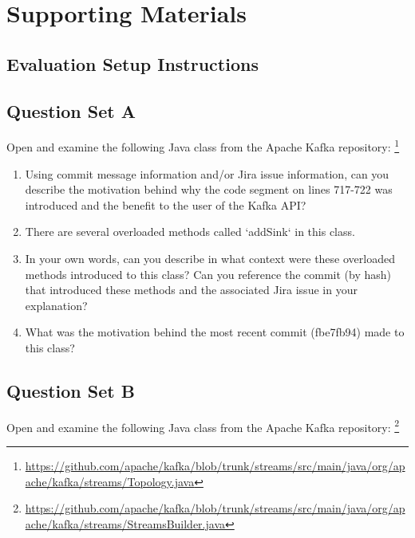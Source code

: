 \chapter{Supporting Materials}

\section{Evaluation Setup Instructions}
\label{sec:Setup-Instructions}


\section{Question Set A}
\label{sec:Question-Set-A}

Open and examine the following Java class from the Apache Kafka repository:
\footnote{\url{https://github.com/apache/kafka/blob/trunk/streams/src/main/java/org/apache/kafka/streams/Topology.java}}

\begin{enumerate}
    \item Using commit message information and/or Jira issue information, can you describe the motivation behind why the code segment on lines 717-722 was introduced and the benefit to the user of the Kafka API?
    \item There are several overloaded methods called `addSink` in this class. \item In your own words, can you describe in what context were these overloaded methods introduced to this class? Can you reference the commit (by hash) that introduced these methods and the associated Jira issue in your explanation?
    \item What was the motivation behind the most recent commit (fbe7fb94) made to this class?
\end{enumerate}

\section{Question Set B}
\label{sec:Question-Set-B}

Open and examine the following Java class from the Apache Kafka repository:
\footnote{\url{https://github.com/apache/kafka/blob/trunk/streams/src/main/java/org/apache/kafka/streams/StreamsBuilder.java}}


